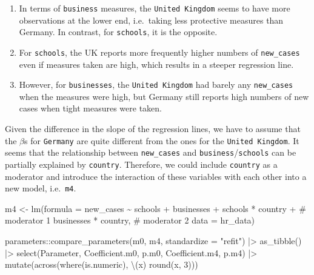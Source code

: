 \documentclass[
  letterpaper,
]{krantz}
\makeatletter
\newenvironment{Shaded}{\begin{snugshade}}{\end{snugshade}}
\newcommand{\AttributeTok}[1]{\textcolor[rgb]{0.40,0.45,0.13}{#1}}
\newcommand{\CommentTok}[1]{\textcolor[rgb]{0.37,0.37,0.37}{#1}}
\newcommand{\DecValTok}[1]{\textcolor[rgb]{0.68,0.00,0.00}{#1}}
\newcommand{\FunctionTok}[1]{\textcolor[rgb]{0.28,0.35,0.67}{#1}}
\newcommand{\NormalTok}[1]{\textcolor[rgb]{0.00,0.23,0.31}{#1}}
\newcommand{\OtherTok}[1]{\textcolor[rgb]{0.00,0.23,0.31}{#1}}
\newcommand{\SpecialCharTok}[1]{\textcolor[rgb]{0.37,0.37,0.37}{#1}}
\newcommand{\StringTok}[1]{\textcolor[rgb]{0.13,0.47,0.30}{#1}}
\providecommand{\tightlist}{%
  \setlength{\itemsep}{0pt}\setlength{\parskip}{0pt}}\usepackage{longtable,booktabs,array}
\newenvironment{kframe}{%
\medskip{}
\setlength{\fboxsep}{.8em}
 \def\at@end@of@kframe{}%
 \ifinner\ifhmode%
  \def\at@end@of@kframe{\end{minipage}}%
  \begin{minipage}{\columnwidth}%
 \fi\fi%
 \def\FrameCommand##1{\hskip\@totalleftmargin \hskip-\fboxsep
 \colorbox{shadecolor}{##1}\hskip-\fboxsep
     \hskip-\linewidth \hskip-\@totalleftmargin \hskip\columnwidth}%
 \MakeFramed {\advance\hsize-\width
   \@totalleftmargin\z@ \linewidth\hsize
   \@setminipage}}%
 {\par\unskip\endMakeFramed%
 \at@end@of@kframe}
\renewenvironment{Shaded}{\begin{kframe}}{\end{kframe}}
\makeatother
\begin{document}
\begin{enumerate}
\def\labelenumi{\arabic{enumi}.}
\tightlist
\item
  In terms of \texttt{business} measures, the \texttt{United\ Kingdom}
  seems to have more observations at the lower end, i.e.~taking less
  protective measures than Germany. In contrast, for \texttt{schools},
  it is the opposite.
\item
  For \texttt{schools}, the UK reports more frequently higher numbers of
  \texttt{new\_cases} even if measures taken are high, which results in
  a steeper regression line.
\item
  However, for \texttt{businesses}, the \texttt{United\ Kingdom} had
  barely any \texttt{new\_cases} when the measures were high, but
  Germany still reports high numbers of new cases when tight measures
  were taken.
\end{enumerate}

Given the difference in the slope of the regression lines, we have to
assume that the \(\beta\)s for \texttt{Germany} are quite different from
the ones for the \texttt{United\ Kingdom}. It seems that the
relationship between \texttt{new\_cases} and
\texttt{business}/\texttt{schools} can be partially explained by
\texttt{country}. Therefore, we could include \texttt{country} as a
moderator and introduce the interaction of these variables with each
other into a new model, i.e.~\texttt{m4}.

\begin{Shaded}
\begin{Highlighting}[]
\NormalTok{m4 }\OtherTok{\textless{}{-}} \FunctionTok{lm}\NormalTok{(}\AttributeTok{formula =}\NormalTok{ new\_cases }\SpecialCharTok{\textasciitilde{}}
\NormalTok{           schools }\SpecialCharTok{+}
\NormalTok{           businesses }\SpecialCharTok{+}
\NormalTok{           schools }\SpecialCharTok{*}\NormalTok{ country }\SpecialCharTok{+}  \CommentTok{\# moderator 1}
\NormalTok{           businesses }\SpecialCharTok{*}\NormalTok{ country, }\CommentTok{\# moderator 2}
         \AttributeTok{data =}\NormalTok{ hr\_data)}

\NormalTok{parameters}\SpecialCharTok{::}\FunctionTok{compare\_parameters}\NormalTok{(m0, m4, }\AttributeTok{standardize =} \StringTok{"refit"}\NormalTok{) }\SpecialCharTok{|\textgreater{}}
  \FunctionTok{as\_tibble}\NormalTok{() }\SpecialCharTok{|\textgreater{}}
  \FunctionTok{select}\NormalTok{(Parameter, Coefficient.m0, p.m0, Coefficient.m4, p.m4) }\SpecialCharTok{|\textgreater{}}
  \FunctionTok{mutate}\NormalTok{(}\FunctionTok{across}\NormalTok{(}\FunctionTok{where}\NormalTok{(is.numeric), \textbackslash{}(x) }\FunctionTok{round}\NormalTok{(x, }\DecValTok{3}\NormalTok{)))}
\end{Highlighting}
\end{Shaded}
\end{document}
